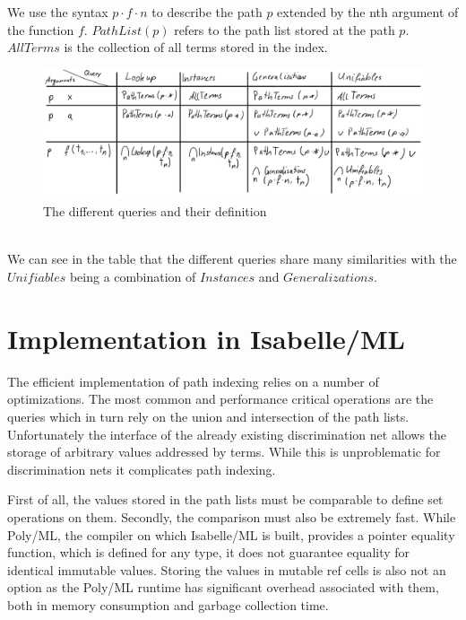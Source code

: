 We use the syntax $p \cdot f \cdot n$ to describe the path $p$ extended by the nth argument of the function $f$. $PathList(p)$ refers to the path list stored at the path $p$. $AllTerms$ is the collection of all terms stored in the index.
\begin{figure}[h]
\centering
\includegraphics[scale=0.25]{figures/queries.png}
\caption{The different queries and their definition}
\end{figure}\\
We can see in the table that the different queries share many similarities with the $Unifiables$ being a combination of $Instances$ and $Generalizations$.

\section{Implementation in Isabelle/ML}
The efficient implementation of path indexing relies on a number of optimizations. The most common and performance critical operations are the queries which in turn rely on the union and intersection of the path lists. Unfortunately the interface of the already existing discrimination net allows the storage of arbitrary values addressed by terms. While this is unproblematic for discrimination nets it complicates path indexing.

First of all, the values stored in the path lists must be comparable to define set operations on them. Secondly, the comparison must also be extremely fast. While Poly/ML, the compiler on which Isabelle/ML is built, provides a pointer equality function, which is defined for any type, it does not guarantee equality for identical immutable values. Storing the values in mutable ref cells is also not an option as the Poly/ML runtime has significant overhead associated with them, both in memory consumption and garbage collection time.

